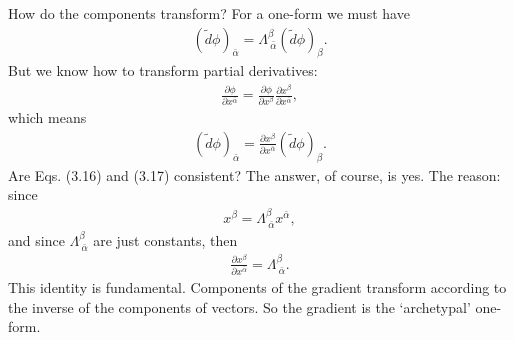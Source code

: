 \documentclass[12pt]{book}
\begin{document}
    How do the components transform? For a one-form we must have
    \begin{align}
    (\tilde{d}\phi)_{\bar{\alpha}} = \Lambda^\beta_{\ \bar{\alpha}} (\tilde{d}\phi)_\beta. \tag{3.16}
    \end{align}
    But we know how to transform partial derivatives:
    \begin{align}
    \frac{\partial \phi}{\partial x^{\bar{\alpha}}} = \frac{\partial \phi}{\partial x^\beta} \frac{\partial x^\beta}{\partial x^{\bar{\alpha}}},
    \end{align}
    which means
    \begin{align}
    (\tilde{d}\phi)_{\bar{\alpha}} = \frac{\partial x^\beta}{\partial x^{\bar{\alpha}}} (\tilde{d}\phi)_\beta. \tag{3.17}
    \end{align}
    Are Eqs. (3.16) and (3.17) consistent? The answer, of course, is yes. The reason: since
    \begin{align}
    x^\beta = \Lambda^\beta_{\ \bar{\alpha}} x^{\bar{\alpha}},
    \end{align}
    and since \(\Lambda^\beta_{\ \bar{\alpha}}\) are just constants, then
    \begin{align}
    \frac{\partial x^\beta}{\partial x^{\bar{\alpha}}} = \Lambda^\beta_{\ \bar{\alpha}}. \tag{3.18}
    \end{align}
    This identity is fundamental. Components of the gradient transform according to the inverse of the components of vectors. So the gradient is the ‘archetypal’ one-form.
\end{document}
